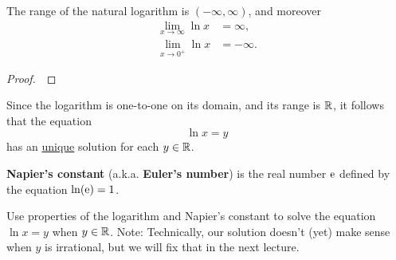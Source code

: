 \begin{theorem}
The range of the natural logarithm is $(-\infty, \infty)$, and moreover
\begin{align*}
\lim_{x\to \infty}\ln x &= \infty,\\
\lim_{x\to 0^+}\ln x &=-\infty.
\end{align*}
\end{theorem}

\ifdefined\SOLUTION
{}
\else
\begin{proof}\,

\vspace{3.5in}
\end{proof}
\fi


\newpage

\begin{remark}
Since the logarithm is one-to-one on its domain, and its range is $\mathbb R$, it follows that the equation
\begin{equation*}
\ln x = y
\end{equation*}
has an \underline{unique} solution for each $y\in\mathbb R$.
\end{remark}


\begin{definition}
\textbf{Napier's constant} (a.k.a. \textbf{Euler's number}) is the real number $\mathrm{e}$ defined by the equation $\ln(\mathrm{e})=1$.
\end{definition}

\begin{example}
Use properties of the logarithm and Napier's constant to solve the equation $\ln x = y$ when $y\in\mathbb R$.
Note: Technically, our solution doesn't (yet) make sense when $y$ is irrational, but we will fix that in the next lecture.
\end{example}

